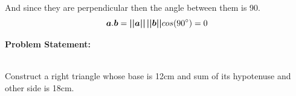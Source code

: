 \documentclass[10pt,a4paper]{report}
\begin{document}
\begin{multicols}{2}
\vspace{2mm}
\raggedright And since they are perpendicular then the angle between them is 90.\\
\vspace{2mm}
\begin{equation}
\boldsymbol{a}.\boldsymbol{b}=\boldsymbol{||a||}\hspace{0.5mm}\boldsymbol{||b||}cos(90^{\circ})=0
\end{equation}
\raggedright \textbf{Problem Statement:}\vspace{2mm}
\raggedright \\Construct a right triangle whose base is 12cm and sum of its hypotenuse and other side is 18cm.
\vspace{5mm}


\end{multicols}
\end{document}
